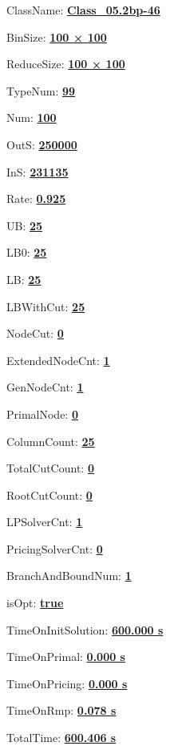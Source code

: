 \documentclass[11pt]{article}
\begin{document}
\pagestyle{empty}


ClassName: \underline{\textbf{Class_05.2bp-46}}
\par
BinSize: \underline{\textbf{100 × 100}}
\par
ReduceSize: \underline{\textbf{100 × 100}}
\par
TypeNum: \underline{\textbf{99}}
\par
Num: \underline{\textbf{100}}
\par
OutS: \underline{\textbf{250000}}
\par
InS: \underline{\textbf{231135}}
\par
Rate: \underline{\textbf{0.925}}
\par
UB: \underline{\textbf{25}}
\par
LB0: \underline{\textbf{25}}
\par
LB: \underline{\textbf{25}}
\par
LBWithCut: \underline{\textbf{25}}
\par
NodeCut: \underline{\textbf{0}}
\par
ExtendedNodeCnt: \underline{\textbf{1}}
\par
GenNodeCnt: \underline{\textbf{1}}
\par
PrimalNode: \underline{\textbf{0}}
\par
ColumnCount: \underline{\textbf{25}}
\par
TotalCutCount: \underline{\textbf{0}}
\par
RootCutCount: \underline{\textbf{0}}
\par
LPSolverCnt: \underline{\textbf{1}}
\par
PricingSolverCnt: \underline{\textbf{0}}
\par
BranchAndBoundNum: \underline{\textbf{1}}
\par
isOpt: \underline{\textbf{true}}
\par
TimeOnInitSolution: \underline{\textbf{600.000 s}}
\par
TimeOnPrimal: \underline{\textbf{0.000 s}}
\par
TimeOnPricing: \underline{\textbf{0.000 s}}
\par
TimeOnRmp: \underline{\textbf{0.078 s}}
\par
TotalTime: \underline{\textbf{600.406 s}}
\par
\newpage


\end{document}

